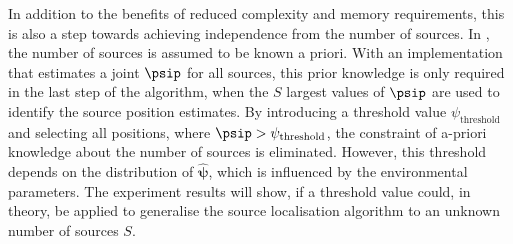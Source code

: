 In addition to the benefits of reduced complexity and memory requirements, this is also a step towards achieving independence from the number of sources. In \cite{Schwartz2014}, the number of sources is assumed to be known a priori. With an implementation that estimates a joint $\psip$ for all sources, this prior knowledge is only required in the last step of the algorithm, when the $S$ largest values of $\psip$ are used to identify the source position estimates. By introducing a threshold value $\psi_{\text{threshold}}$ and selecting all positions, where $\psip>\psi_{\text{threshold}}$, the constraint of a-priori knowledge about the number of sources is eliminated. However, this threshold depends on the distribution of $\hat{\bm\psi}$, which is influenced by the environmental parameters. The experiment results will show, if a threshold value could, in theory, be applied to generalise the source localisation algorithm to an unknown number of sources $S$.
